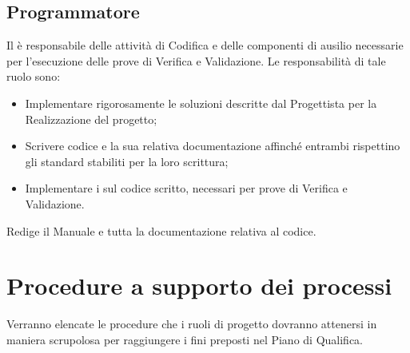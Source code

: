 \subsection{Programmatore}
\label{2.6}
Il  è responsabile delle attività di Codifica e delle componenti di ausilio
necessarie per l'esecuzione delle prove di Verifica e Validazione. Le responsabilità di tale ruolo sono:
\begin{itemize}
\item Implementare rigorosamente le soluzioni descritte dal Progettista per la Realizzazione del progetto;
\item Scrivere codice e la sua relativa documentazione affinché entrambi rispettino gli standard stabiliti per la loro scrittura;
\item Implementare i  sul codice scritto, necessari per prove di Verifica e Validazione.
\end{itemize}
Redige il Manuale  e tutta la documentazione relativa al codice.



\newpage
\section{Procedure a supporto dei processi}
\label{6.0}
Verranno elencate le procedure che i ruoli di progetto dovranno attenersi in maniera scrupolosa per raggiungere i fini preposti nel Piano di Qualifica.

